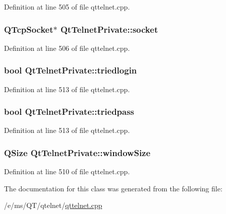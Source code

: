Definition at line 505 of file qttelnet.cpp.

\hypertarget{classQtTelnetPrivate_a8a3800a6c6c14c4501ac0cb5d1f9996b}{
\subsubsection[{socket}]{\setlength{\rightskip}{0pt plus 5cm}QTcpSocket$\ast$ {\bf QtTelnetPrivate::socket}}}
\label{classQtTelnetPrivate_a8a3800a6c6c14c4501ac0cb5d1f9996b}


Definition at line 506 of file qttelnet.cpp.

\hypertarget{classQtTelnetPrivate_acc2df3045ddf17a821c8fd1d5e93e006}{
\subsubsection[{triedlogin}]{\setlength{\rightskip}{0pt plus 5cm}bool {\bf QtTelnetPrivate::triedlogin}}}
\label{classQtTelnetPrivate_acc2df3045ddf17a821c8fd1d5e93e006}


Definition at line 513 of file qttelnet.cpp.

\hypertarget{classQtTelnetPrivate_a9314dd43d6817a310381d8867e9ed56f}{
\subsubsection[{triedpass}]{\setlength{\rightskip}{0pt plus 5cm}bool {\bf QtTelnetPrivate::triedpass}}}
\label{classQtTelnetPrivate_a9314dd43d6817a310381d8867e9ed56f}


Definition at line 513 of file qttelnet.cpp.

\hypertarget{classQtTelnetPrivate_af249e77e92cc059087ea90f48afe7f08}{
\subsubsection[{windowSize}]{\setlength{\rightskip}{0pt plus 5cm}QSize {\bf QtTelnetPrivate::windowSize}}}
\label{classQtTelnetPrivate_af249e77e92cc059087ea90f48afe7f08}


Definition at line 510 of file qttelnet.cpp.



The documentation for this class was generated from the following file:\begin{DoxyCompactItemize}
\item 
/e/ms/QT/qtelnet/\hyperlink{qttelnet_8cpp}{qttelnet.cpp}\end{DoxyCompactItemize}
